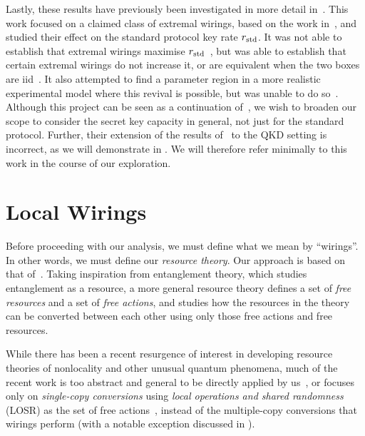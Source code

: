 \documentclass[10pt, a4paper]{article}
\numberwithin{equation}{section} %
\theoremstyle{definition}
\theoremstyle{plain}
\newcommand{\?}{\mathrel{?}} %
\newcommand{\std}{\rm std}
\begin{document}
              Lastly, these results have previously been investigated in more detail in~\cite{JanLiThesis}. This work focused on a claimed class of extremal wirings, based on the work in~\cite{ShortEntangleSwap}, and studied their effect on the standard protocol key rate \(r_{\std}\). It was not able to establish that extremal wirings maximise \(r_{\std}\)~\cite[Sec. 7.2]{JanLiThesis}, but was able to establish that certain extremal wirings do not increase it, or are equivalent when the two boxes are iid~\cite[Sec. 7.3]{JanLiThesis}. It also attempted to find a parameter region in a more realistic experimental model where this revival is possible, but was unable to do so~\cite[Sec. 9]{JanLiThesis}. Although this project can be seen as a continuation of~\cite{JanLiThesis}, we wish to broaden our scope to consider the secret key capacity in general, not just for the standard protocol. Further, their extension of the results of~\cite{ShortEntangleSwap} to the QKD setting is incorrect, as we will demonstrate in . We will therefore refer minimally to this work in the course of our exploration.

              \section{Local Wirings}\label{sec:locwir}

              Before proceeding with our analysis, we must define what we mean by ``wirings''. In other words, we must define our \emph{resource theory}. Our approach is based on that of~\cite{BellResourceTheory}. Taking inspiration from entanglement theory, which studies entanglement as a resource, a more general resource theory defines a set of \emph{free resources} and a set of \emph{free actions}, and studies how the resources in the theory can be converted between each other using only those free actions and free resources.

              While there has been a recent resurgence of interest in developing resource theories of nonlocality and other unusual quantum phenomena, much of the recent work is too abstract and general to be directly applied by us~\cite{Monotones, TypeIndepLOSR}, or focuses only on \emph{single-copy conversions} using \emph{local operations and shared randomness} (LOSR) as the set of free actions~\cite{BellResourceTheory, TraceDistNL, NLMeas}, instead of the multiple-copy conversions that wirings perform (with a notable exception discussed in ).
\end{document}
